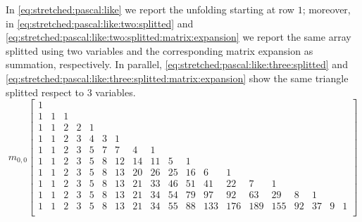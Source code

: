 In \autoref{eq:stretched:pascal:like} we report the unfolding starting at row $1$;
moreover, in \autoref{eq:stretched:pascal:like:two:splitted} and 
\autoref{eq:stretched:pascal:like:two:splitted:matrix:expansion} we report the same array splitted 
using two variables and the corresponding matrix expansion as summation, respectively.
In parallel, \autoref{eq:stretched:pascal:like:three:splitted} and 
\autoref{eq:stretched:pascal:like:three:splitted:matrix:expansion} show the
same triangle splitted respect to $3$ variables.
\begin{equation}
m_{0,0}\left[\begin{array}{ccccccccccccccccccc}
1 &  &  &  &  &  &  &  &  &  &  &  &  &  &  &  &  &  &  \\
1 & 1 & 1 &  &  &  &  &  &  &  &  &  &  &  &  &  &  &  &  \\
1 & 1 & 2 & 2 & 1 &  &  &  &  &  &  &  &  &  &  &  &  &  &  \\
1 & 1 & 2 & 3 & 4 & 3 & 1 &  &  &  &  &  &  &  &  &  &  &  &  \\
1 & 1 & 2 & 3 & 5 & 7 & 7 & 4 & 1 &  &  &  &  &  &  &  &  &  &  \\
1 & 1 & 2 & 3 & 5 & 8 & 12 & 14 & 11 & 5 & 1 &  &  &  &  &  &  &  &  \\
1 & 1 & 2 & 3 & 5 & 8 & 13 & 20 & 26 & 25 & 16 & 6 & 1 &  &  &  &  &  &  \\
1 & 1 & 2 & 3 & 5 & 8 & 13 & 21 & 33 & 46 & 51 & 41 & 22 & 7 & 1 &  &  &  &  \\
1 & 1 & 2 & 3 & 5 & 8 & 13 & 21 & 34 & 54 & 79 & 97 & 92 & 63 & 29 & 8 & 1 &  &  \\
1 & 1 & 2 & 3 & 5 & 8 & 13 & 21 & 34 & 55 & 88 & 133 & 176 & 189 & 155 & 92 & 37 & 9 & 1 \\
\end{array}\right]
\label{eq:stretched:pascal:like}
\end{equation}


